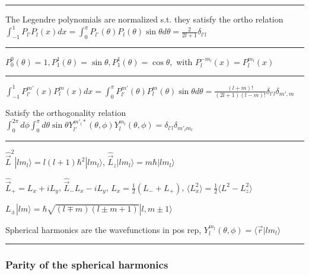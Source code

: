 \hrule height 0.1pt

The Legendre polynomials are normalized s.t. they satisfy the ortho relation $\int_{-1}^{1} P_{l'} P_l(x) dx = \int_0^{\pi} P_{l'}(\theta) P_l(\theta) \sin \theta d \theta = \frac{2}{2 l + 1} \delta_{l' l}$

\hrule height 0.1pt 



$P_0^0(\theta) = 1, P_1^1(\theta) = \sin \theta, P_1^1(\theta) = \cos \theta,$
with $P_l^{-m_l}(x) = P_l^{m_l}(x)$

\hrule height 0.1pt

\tiny
$\int_{-1}^{1} P_{l'}^{m'} (x) P_{l}^{m} (x) dx = \int_0^{\pi} P_{l'}^{m'}(\theta) P_l^{m} (\theta) \sin \theta d \theta = \frac{(l+m)!}{(2l+1)(l-m)!} \delta_{l'l} \delta_{m', m}$
\scriptsize


Satisfy the orthogonality relation $\int_0^{2 \pi} d\phi \int_0^{\pi} d\theta \sin \theta Y_{l'}^{m'_l *} (\theta, \phi) Y_l^{m_l} (\theta, \phi) = \delta_{l'l} \delta_{m'_l m_l}$

\hrule height 0.1pt

$\widehat{\vec{L}}^2 | l m_l \rangle = l(l+1) \hbar^2 |l m_l \rangle$, $\widehat{\vec{L}}_z | l m_l \rangle = m \hbar |l m_l \rangle$


$\widehat{\vec{L}}_{+} = L_x + iL_y$, $\widehat{\vec{L}}_{-} L_x - i L_y$, $L_x = \frac{1}{2}(L_{-} + L_{+})$, $\langle L_x^2 \rangle = \frac{1}{2} \langle L^2 - L_z^2 \rangle$

$L_{\pm} |lm \rangle = \hbar \sqrt{(l \mp m)(l \pm m + 1)} | l, m \pm 1 \rangle$

Spherical harmonics are the wavefunctions in pos rep, $Y_l^{m_l}(\theta, \phi) = \langle \vec{r} | l m_l \rangle$

\hrule height 0.1pt

\subsubsection{Parity of the spherical harmonics}

